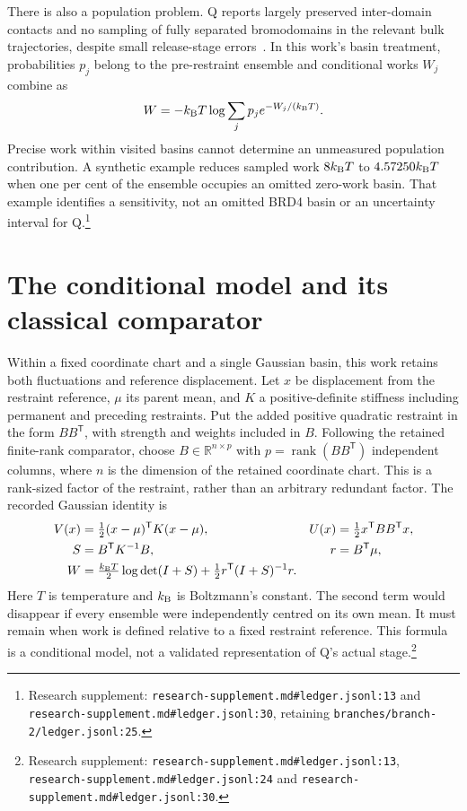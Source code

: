 \documentclass{article}
\begin{document}
There is also a population problem. Q reports largely preserved inter-domain contacts and no sampling of fully separated bromodomains in the relevant bulk trajectories, despite small release-stage errors~\cite{Q}. In this work's basin treatment, probabilities \(p_j\) belong to the pre-restraint ensemble and conditional works \(W_j\) combine as
\[
 W=-k_{\rm B}T\log\sum_jp_j e^{-W_j/(k_{\rm B}T)}.
\]
Precise work within visited basins cannot determine an unmeasured population contribution. A synthetic example reduces sampled work \(8k_{\rm B}T\) to \(4.57250k_{\rm B}T\) when one per cent of the ensemble occupies an omitted zero-work basin. That example identifies a sensitivity, not an omitted BRD4 basin or an uncertainty interval for Q.\footnote{Research supplement: \nolinkurl{research-supplement.md#ledger.jsonl:13} and \nolinkurl{research-supplement.md#ledger.jsonl:30}, retaining \nolinkurl{branches/branch-2/ledger.jsonl:25}.}

\section{The conditional model and its classical comparator}

Within a fixed coordinate chart and a single Gaussian basin, this work retains both fluctuations and reference displacement. Let \(x\) be displacement from the restraint reference, \(\mu\) its parent mean, and \(K\) a positive-definite stiffness including permanent and preceding restraints. Put the added positive quadratic restraint in the form \(BB^{\mathsf T}\), with strength and weights included in \(B\). Following the retained finite-rank comparator, choose \(B\in\mathbb{R}^{n\times p}\) with \(p=\operatorname{rank}(BB^{\mathsf T})\) independent columns, where \(n\) is the dimension of the retained coordinate chart. This is a rank-sized factor of the restraint, rather than an arbitrary redundant factor. The recorded Gaussian identity is
\[
\begin{aligned}
 V(x)&=\tfrac12(x-\mu)^{\mathsf T}K(x-\mu),&
 U(x)&=\tfrac12x^{\mathsf T}BB^{\mathsf T}x,\\
 S&=B^{\mathsf T}K^{-1}B,&r&=B^{\mathsf T}\mu,\\
 W&=\tfrac{k_{\rm B}T}{2}\log\det(I+S)
       +\tfrac12r^{\mathsf T}(I+S)^{-1}r.
\end{aligned}
\]
Here \(T\) is temperature and \(k_{\rm B}\) is Boltzmann's constant. The second term would disappear if every ensemble were independently centred on its own mean. It must remain when work is defined relative to a fixed restraint reference. This formula is a conditional model, not a validated representation of Q's actual stage.\footnote{Research supplement: \nolinkurl{research-supplement.md#ledger.jsonl:13}, \nolinkurl{research-supplement.md#ledger.jsonl:24} and \nolinkurl{research-supplement.md#ledger.jsonl:30}.}
\end{document}
